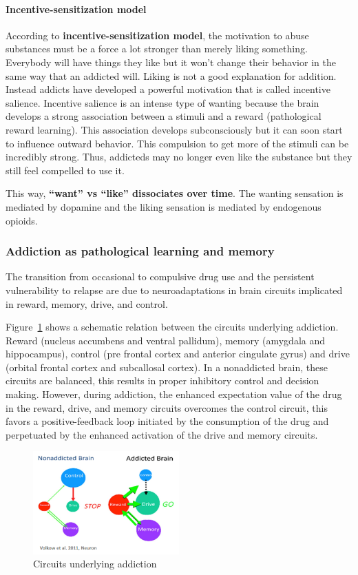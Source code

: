 \documentclass[12pt,article,oneside,a4paper]{memoir}
\begin{document}
\paragraph{Incentive-sensitization model}
According to \textbf{incentive-sensitization model}, the motivation to abuse
substances must be a force a lot stronger than merely liking something.
Everybody will have things they like but it won't change their behavior in the
same way that an addicted will. Liking is not a good explanation for addition.
Instead addicts have developed a powerful motivation that is called incentive
salience. Incentive salience is an intense type of wanting because the brain
develops a strong association between a stimuli and a reward (pathological
reward learning). This association develops subconsciously but it can soon
start to influence outward behavior. This compulsion to get more of the stimuli
can be incredibly strong. Thus, addicteds may no longer even like the substance
but they still feel compelled to use it.

This way, \textbf{``want'' vs ``like'' dissociates over time}. The wanting
sensation is mediated by dopamine and the liking sensation is mediated by
endogenous opioids.


\subsubsection{Addiction as pathological learning and memory}
The transition from occasional to compulsive drug use and the persistent
vulnerability to relapse are due to neuroadaptations in brain circuits
implicated in reward, memory, drive, and control.

Figure~\ref{fig:circuits-drug-addiction} shows a schematic relation between the
circuits underlying addiction. Reward (nucleus accumbens and ventral pallidum),
memory (amygdala and hippocampus), control (pre frontal cortex and anterior
cingulate gyrus) and drive (orbital frontal cortex and subcallosal cortex). In
a nonaddicted brain, these circuits are balanced, this results in proper
inhibitory control and decision making. However, during addiction, the enhanced
expectation value of the drug in the reward, drive, and memory circuits
overcomes the control circuit, this favors a positive-feedback loop initiated
by the consumption of the drug and perpetuated by the enhanced activation of
the drive and memory circuits. 

\begin{figure}
  \centering
  \includegraphics[width=0.5\textwidth]{imgs/circuits-drug-addiction.png}
  \caption{Circuits underlying addiction}
  \label{fig:circuits-drug-addiction}
\end{figure}
\end{document}
